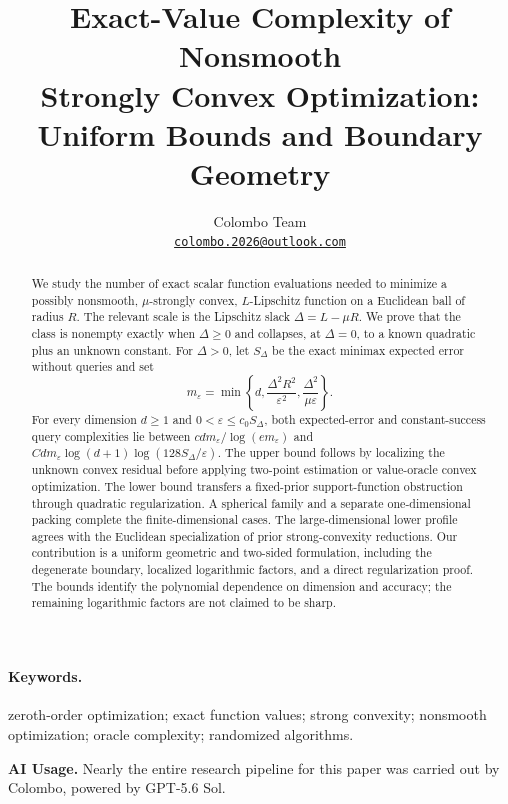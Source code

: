\documentclass[11pt]{article}
\title{Exact-Value Complexity of Nonsmooth\\
Strongly Convex Optimization:\\
Uniform Bounds and Boundary Geometry}
\author{Colombo Team\\[0.3em]
\small\href{mailto:colombo.2026@outlook.com}{\texttt{colombo.2026@outlook.com}}}
\date{}
\newcommand{\eps}{\varepsilon}
\theoremstyle{plain}
\theoremstyle{definition}
\begin{document}
\maketitle

\begin{abstract}
We study the number of exact scalar function evaluations needed to minimize
a possibly nonsmooth, $\mu$-strongly convex, $L$-Lipschitz function on a
Euclidean ball of radius $R$. The relevant scale is the Lipschitz slack
$\Delta=L-\mu R$. We prove that the class is nonempty exactly when
$\Delta\ge0$ and collapses, at $\Delta=0$, to a known quadratic plus an
unknown constant. For $\Delta>0$, let $S_\Delta$ be the exact minimax
expected error without queries and set
\[
 m_\eps=\min\left\{d,\frac{\Delta^2R^2}{\eps^2},
                         \frac{\Delta^2}{\mu\eps}\right\}.
\]
For every dimension $d\ge1$ and $0<\eps\le c_0S_\Delta$, both expected-error
and constant-success query complexities lie between
$c d m_\eps/\log(e m_\eps)$ and
$C d m_\eps\log(d+1)\log(128S_\Delta/\eps)$.
The upper bound follows by localizing the unknown convex residual before
applying two-point estimation or value-oracle convex optimization.
The lower bound transfers a fixed-prior support-function obstruction
through quadratic regularization. A spherical family and a separate
one-dimensional packing complete the finite-dimensional cases. The large-dimensional
lower profile agrees with the Euclidean specialization of prior
strong-convexity reductions. Our contribution is a uniform geometric
and two-sided formulation, including the degenerate boundary, localized
logarithmic factors, and a direct regularization proof. The bounds
identify the polynomial dependence on dimension and accuracy; the
remaining logarithmic factors are not claimed to be sharp.
\end{abstract}

\paragraph{Keywords.}
zeroth-order optimization; exact function values; strong convexity;
nonsmooth optimization; oracle complexity; randomized algorithms.

\begin{samepage}
\noindent\textbf{AI Usage.}
Nearly the entire research pipeline for this paper was carried out by
Colombo, powered by GPT-5.6 Sol. 
\par
\end{samepage}
\end{document}
